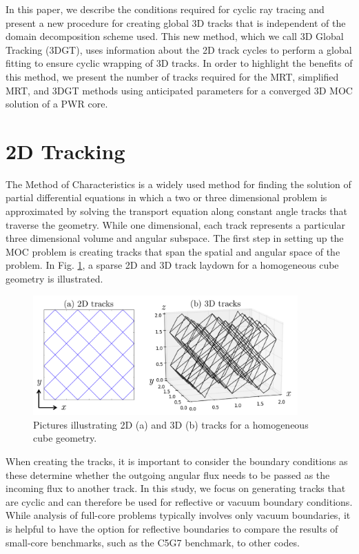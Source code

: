 In this paper, we describe the conditions required for cyclic ray tracing and present a new procedure for creating global 3D tracks that is independent of the domain decomposition scheme used. This new method, which we call 3D Global Tracking (3DGT), uses information about the 2D track cycles to perform a global fitting to ensure cyclic wrapping of 3D tracks. In order to highlight the benefits of this method, we present the number of tracks required for the MRT, simplified MRT, and 3DGT methods using anticipated parameters for a converged 3D MOC solution of a PWR core. 

\section{2D Tracking}

The Method of Characteristics is a widely used method for finding the solution of partial differential equations in which a two or three dimensional problem is approximated by solving the transport equation along constant angle tracks that traverse the geometry. While one dimensional, each track represents a particular three dimensional volume and angular subspace. The first step in setting up the MOC problem is creating tracks that span the spatial and angular space of the problem. In Fig. \ref{sample-tracks}, a sparse 2D and 3D track laydown for a homogeneous cube geometry is illustrated.

\begin{figure}[H]
	\vspace{-0.1in}
	\centering
	\includegraphics[width=4in]{figures/mc2015/sample-tracks-2.png}
	\caption{Pictures illustrating 2D (a) and 3D (b) tracks for a homogeneous cube geometry.}
	\label{sample-tracks}
\end{figure}

When creating the tracks, it is important to consider the boundary conditions as these determine whether the outgoing angular flux needs to be passed as the incoming flux to another track. In this study, we focus on generating tracks that are cyclic and can therefore be used for reflective or vacuum boundary conditions. While analysis of full-core problems typically involves only vacuum boundaries, it is helpful to have the option for reflective boundaries to compare the results of small-core benchmarks, such as the C5G7 benchmark, to other codes.

